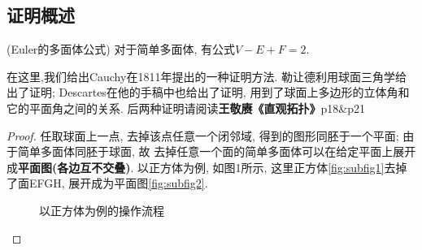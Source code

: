 \documentclass[main]{subfiles}
\begin{document}
\subsection{证明概述}
\begin{theorem}(Euler的多面体公式)
  对于简单多面体, 有公式$V-E+F=2$.
\end{theorem}
在这里,我们给出Cauchy在1811年提出的一种证明方法. 
勒让德利用球面三角学给出了证明; Descartes在他的手稿中也给出了证明, 用到了球面上多边形的立体角和它的平面角之间的关系. 后两种证明请阅读\textbf{王敬赓《直观拓扑》}p18\&p21
\begin{proof}
  任取球面上一点, 去掉该点任意一个闭邻域, 得到的图形同胚于一个平面; 由于简单多面体同胚于球面, 故
  去掉任意一个面的简单多面体可以在给定平面上展开成\textbf{平面图(各边互不交叠)}. 以正方体为例, 如图1所示, 
  这里正方体\ref{fig:subfig1}去掉了面EFGH, 展开成为平面图\ref{fig:subfig2}.

  \begin{figure}[h]    
      \centering            
      \caption{以正方体为例的操作流程}
      \label{fig:subfig_1} 
  \end{figure}


\end{proof}
\end{document}
